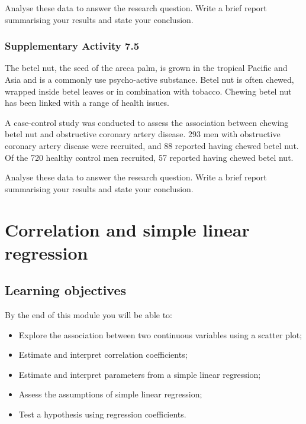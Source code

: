\documentclass[
  a4paper,
]{memoir}
\providecommand{\tightlist}{%
  \setlength{\itemsep}{0pt}\setlength{\parskip}{0pt}}
\begin{document}
Analyse these data to answer the research question. Write a brief report
summarising your results and state your conclusion.

\subsection*{Supplementary Activity
7.5}\label{supplementary-activity-7.5}

The betel nut, the seed of the areca palm, is grown in the tropical
Pacific and Asia and is a commonly use psycho-active substance. Betel
nut is often chewed, wrapped inside betel leaves or in combination with
tobacco. Chewing betel nut has been linked with a range of health
issues.

A case-control study was conducted to assess the association between
chewing betel nut and obstructive coronary artery disease. 293 men with
obstructive coronary artery disease were recruited, and 88 reported
having chewed betel nut. Of the 720 healthy control men recruited, 57
reported having chewed betel nut.

Analyse these data to answer the research question. Write a brief report
summarising your results and state your conclusion.


\chapter{Correlation and simple linear
regression}\label{correlation-and-simple-linear-regression}

\section*{Learning objectives}\label{learning-objectives-7}


By the end of this module you will be able to:

\begin{itemize}
\tightlist
\item
  Explore the association between two continuous variables using a
  scatter plot;
\item
  Estimate and interpret correlation coefficients;
\item
  Estimate and interpret parameters from a simple linear regression;
\item
  Assess the assumptions of simple linear regression;
\item
  Test a hypothesis using regression coefficients.
\end{itemize}
\end{document}
